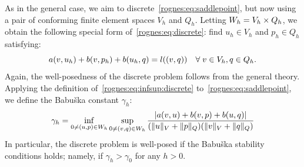 As in the general case, we aim to
discrete~\eqref{rognes:eq:saddlepoint}, but now using a pair of
conforming finite element spaces $V_h$ and $Q_h$. Letting $W_h = V_h
\times Q_h$, we obtain the following special form
of~\eqref{rognes:eq:discrete}: find $u_h \in V_h$ and $p_h \in Q_h$
satisfying:
\begin{equation}
    \label{rognes:eq:saddlepoint:discrete}
    a(v, u_h) + b(v, p_h) + b(u_h, q) = l((v, q))
    \quad \forall \; v \in V_h, q \in Q_h.
\end{equation}
Again, the well-posedness of the discrete problem follows from the
general theory. Applying the definition of~\eqref{rognes:eq:infsup:discrete}
to~\eqref{rognes:eq:saddlepoint}, we define the Babu\v ska constant
$\gamma_h$:
\begin{equation}
  \label{rognes:eq:Babuska}
  \gamma_h = \inf_{0 \not = (u, p) \in W_h} \sup_{0 \not = (v, q) \in W_h}
  \frac{|a(v, u) + b(v, p) + b(u, q)|} {(\|u\|_{V} + \|p\|_{Q})
    (\|v\|_{V} + \|q\|_{Q})}
\end{equation}
In particular, the discrete problem is well-posed if the Babu\v ska
stability conditions holds; namely, if $\gamma_h > \gamma_0$ for any
$h > 0$.


